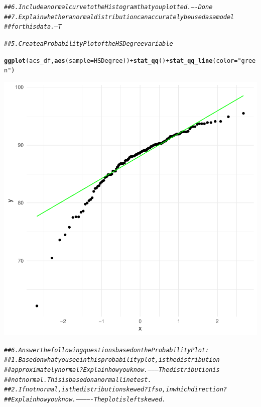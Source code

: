 \documentclass{article}\usepackage[]{graphicx}\usepackage[]{xcolor}
\makeatletter
\newcommand{\hlstr}[1]{\textcolor[rgb]{0.192,0.494,0.8}{#1}}%
\newcommand{\hlcom}[1]{\textcolor[rgb]{0.678,0.584,0.686}{\textit{#1}}}%
\newcommand{\hlopt}[1]{\textcolor[rgb]{0,0,0}{#1}}%
\newcommand{\hlstd}[1]{\textcolor[rgb]{0.345,0.345,0.345}{#1}}%
\newcommand{\hlkwc}[1]{\textcolor[rgb]{0.333,0.667,0.333}{#1}}%
\newcommand{\hlkwd}[1]{\textcolor[rgb]{0.737,0.353,0.396}{\textbf{#1}}}%
\newenvironment{kframe}{%
 \def\at@end@of@kframe{}%
 \ifinner\ifhmode%
  \def\at@end@of@kframe{\end{minipage}}%
  \begin{minipage}{\columnwidth}%
 \fi\fi%
 \def\FrameCommand##1{\hskip\@totalleftmargin \hskip-\fboxsep
 \colorbox{shadecolor}{##1}\hskip-\fboxsep
     \hskip-\linewidth \hskip-\@totalleftmargin \hskip\columnwidth}%
 \MakeFramed {\advance\hsize-\width
   \@totalleftmargin\z@ \linewidth\hsize
   \@setminipage}}%
 {\par\unskip\endMakeFramed%
 \at@end@of@kframe}
\newenvironment{knitrout}{}{} %
\makeatother
\begin{document}
\begin{knitrout}
\color{fgcolor}\begin{kframe}
\begin{alltt}
\hlcom{##    6. Include a normal curve to the Histogram that you plotted.----Done  }
\hlcom{##    7. Explain whether a normal distribution can accurately be used as a model}
\hlcom{##        for this data.-- T}




\hlcom{## 5. Create a Probability Plot of the HSDegree variable}

\hlkwd{ggplot}\hlstd{(acs_df,} \hlkwd{aes}\hlstd{(}\hlkwc{sample} \hlstd{= HSDegree))} \hlopt{+} \hlkwd{stat_qq}\hlstd{()} \hlopt{+} \hlkwd{stat_qq_line}\hlstd{(}\hlkwc{color}\hlstd{=}\hlstr{"green"}\hlstd{)}
\end{alltt}
\end{kframe}

{\centering \includegraphics[width=.6\linewidth]{figure/assignment-03-1-Reppeto-Brian-RnwLeft-skewed_unimodal-1} 

}


\begin{kframe}\begin{alltt}
\hlcom{## 6.Answer the following questions based on the Probability Plot:}
\hlcom{##    1.Based on what you see in this probability plot, is the distribution }
\hlcom{##      approximately normal? Explain how you know.--------The distribution is }
\hlcom{##      not normal.  This is based on a normal line test.}
\hlcom{##    2.If not normal, is the distribution skewed? If so, in which direction? }
\hlcom{##      Explain how you know.-------------The plot is left skewed.}





\end{alltt}
\end{kframe}
\end{knitrout}
\end{document}

